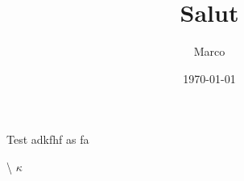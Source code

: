 \documentclass[12pt,draft,twocolumn]{article}
\author{Marco}
\title{Salut}
\date{\today}
\begin{document}
\maketitle
Test adkfhf as fa
\par
\blindtext[2]
\textbackslash
$\kappa$
\end{document}
